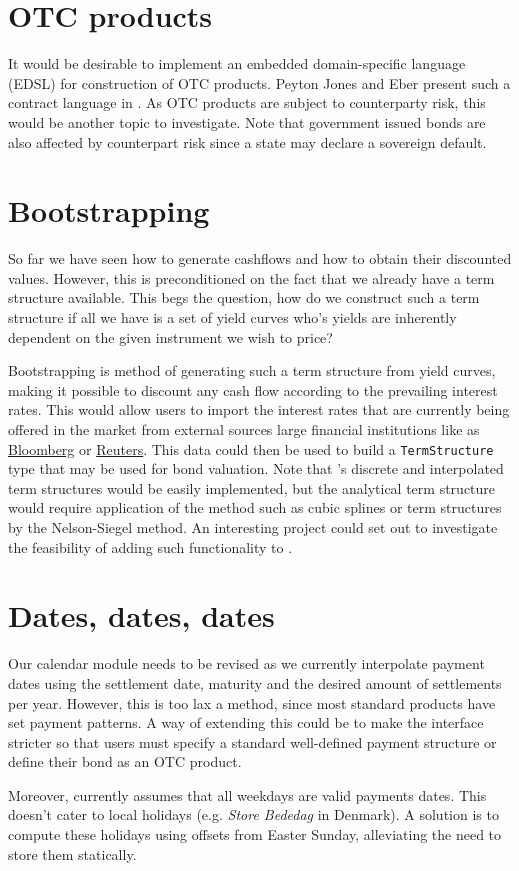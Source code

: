 \section{OTC products}

It would be desirable to implement an embedded domain-specific language (EDSL)
for construction of OTC products. Peyton Jones and Eber present such a contract
language in \cite{composingcontracts}. As OTC products are subject to
counterparty risk, this would be another topic to investigate. Note that government
issued bonds are also affected by counterpart risk since a state may declare
a sovereign default.

\section{Bootstrapping}

So far we have seen how to generate cashflows and how to obtain their 
discounted values. However, this is preconditioned on the fact that we already 
have a term structure available. This begs the question, how do we construct 
such a term structure if all we have is a set of yield curves who's yields 
are inherently dependent on the given instrument we wish to price?

Bootstrapping is method of generating such a term structure from yield 
curves, making it possible to discount any cash flow according to the 
prevailing interest rates. 
This would allow users to import the interest rates that are currently being 
offered in the market from external sources large financial institutions like
as \href{www.bloomberg.com}{Bloomberg} or \href{www.reuters.com}{Reuters}.
This data could then be used to build a \texttt{TermStructure} type 
that may be used for bond valuation. Note that \hql's discrete and interpolated 
term structures would be easily implemented, but the analytical term structure
would require application of the method such as cubic splines or term structures
by the Nelson-Siegel method. 
An interesting project could set out to investigate the feasibility of adding such 
functionality to \hql.

\section{Dates, dates, dates}

Our calendar module needs to be revised as we currently interpolate 
payment dates using the settlement date, maturity and the desired amount of 
settlements per year. However, this is too lax a method, since most standard 
products have set payment patterns. A way of extending this could be to make
the interface stricter so that users must specify a standard well-defined
payment structure or define their bond as an OTC product.

Moreover, \hql currently assumes that all weekdays are valid payments dates. 
This doesn't cater to local holidays (e.g. \emph{Store Bededag} in Denmark). A 
solution is to compute these holidays using offsets from Easter Sunday, 
alleviating the need to store them statically.\\

